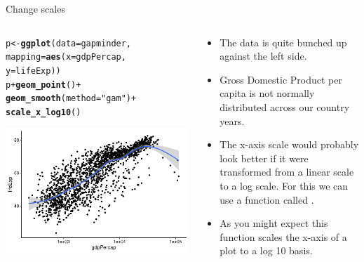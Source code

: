\documentclass[10pt]{beamer}\usepackage[]{graphicx}\usepackage[]{color}
\makeatletter
\def\maxwidth{ %
  \ifdim\Gin@nat@width>\linewidth
    \linewidth
  \else
    \Gin@nat@width
  \fi
}
\newcommand{\hlstr}[1]{\textcolor[rgb]{0.192,0.494,0.8}{#1}}%
\newcommand{\hlopt}[1]{\textcolor[rgb]{0,0,0}{#1}}%
\newcommand{\hlstd}[1]{\textcolor[rgb]{0.345,0.345,0.345}{#1}}%
\newcommand{\hlkwb}[1]{\textcolor[rgb]{0.69,0.353,0.396}{#1}}%
\newcommand{\hlkwc}[1]{\textcolor[rgb]{0.333,0.667,0.333}{#1}}%
\newcommand{\hlkwd}[1]{\textcolor[rgb]{0.737,0.353,0.396}{\textbf{#1}}}%
\newenvironment{kframe}{%
 \def\at@end@of@kframe{}%
 \ifinner\ifhmode%
  \def\at@end@of@kframe{\end{minipage}}%
  \begin{minipage}{\columnwidth}%
 \fi\fi%
 \def\FrameCommand##1{\hskip\@totalleftmargin \hskip-\fboxsep
 \colorbox{shadecolor}{##1}\hskip-\fboxsep
     \hskip-\linewidth \hskip-\@totalleftmargin \hskip\columnwidth}%
 \MakeFramed {\advance\hsize-\width
   \@totalleftmargin\z@ \linewidth\hsize
   \@setminipage}}%
 {\par\unskip\endMakeFramed%
 \at@end@of@kframe}
\newenvironment{knitrout}{}{} %
\makeatother
\begin{document}
\begin{frame}[fragile]{Change scales}
	\begin{columns}
		\begin{column}{0.5\textwidth}  %
\begin{knitrout}\tiny
{}\color{fgcolor}\begin{kframe}
\begin{alltt}
\hlstd{p} \hlkwb{<-} \hlkwd{ggplot}\hlstd{(}\hlkwc{data} \hlstd{= gapminder,}
        \hlkwc{mapping} \hlstd{=} \hlkwd{aes}\hlstd{(}\hlkwc{x} \hlstd{= gdpPercap,}
                \hlkwc{y}\hlstd{=lifeExp))}
\hlstd{p} \hlopt{+} \hlkwd{geom_point}\hlstd{()} \hlopt{+}
        \hlkwd{geom_smooth}\hlstd{(}\hlkwc{method} \hlstd{=} \hlstr{"gam"}\hlstd{)} \hlopt{+}
        \hlkwd{scale_x_log10}\hlstd{()}
\end{alltt}


{\ttfamily\noindent\itshape{}}\end{kframe}

{\centering \includegraphics[width=\maxwidth]{figure/unnamed-chunk-9-1} 

}


\end{knitrout}
		\end{column}\pause 
		\begin{column}{0.5\textwidth}
			\begin{itemize}
				\item The data is quite bunched up against the left side. 
				\item Gross Domestic Product per capita is not normally distributed across our country years. 
				\item The x-axis scale would probably look better if it were transformed from a linear scale to a log scale. For this we can use a function called . 
				\item As you might expect this function scales the x-axis of a plot to a log 10 basis. 
			\end{itemize}
		\end{column}
	\end{columns}
\end{frame}
\end{document}
